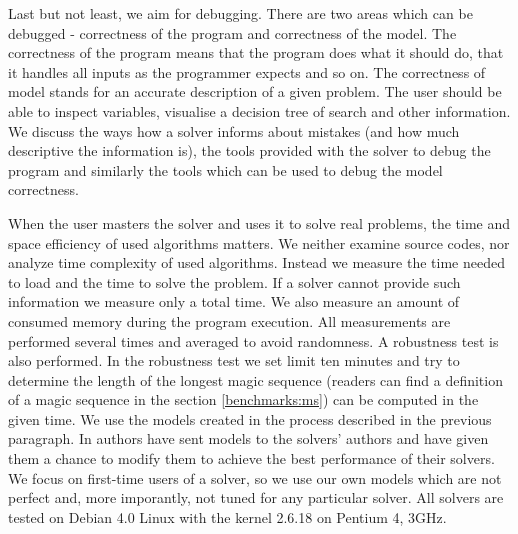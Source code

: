 Last but not least, we aim for debugging. There are two areas which can be 
debugged - correctness of the program and correctness of the model. The correctness of the
program means that the program does what it should do, that it handles all inputs as the programmer expects and so on. 
The correctness of model stands for an accurate description of a given problem. The user should be able to 
inspect variables, visualise a decision tree of search and other information. 
We discuss the ways how a solver informs about mistakes (and how much descriptive the 
information is), the tools provided with the solver to debug the program and similarly the 
tools which can be used to debug the model correctness.

When the user masters the solver and uses it to solve real problems, the time and space 
efficiency of used algorithms matters. We neither examine source codes, nor analyze 
time complexity of used algorithms. Instead we measure the time needed to 
load and the time to solve the problem. If a solver cannot provide such information 
we measure only a total time. We also measure an amount of consumed memory 
during the program execution. All measurements are performed several times 
and averaged to avoid randomness. A robustness test is also performed. 
In the robustness test we set limit ten minutes and try to determine the length of the longest magic 
sequence (readers can find a definition of a magic sequence in the section \ref{benchmarks:ms}) 
can be computed in the given time. We use the models created in the process described in the previous 
paragraph. In \cite{fernandez00} authors have sent models to the solvers' authors and 
have given them a chance to modify them to achieve the best performance of their solvers. 
We focus on first-time users of a solver, so we use our own models which are 
not perfect and, more imporantly, not tuned for any particular solver. All solvers 
are tested on Debian 4.0 Linux with the kernel 2.6.18 on Pentium 4, 3GHz.